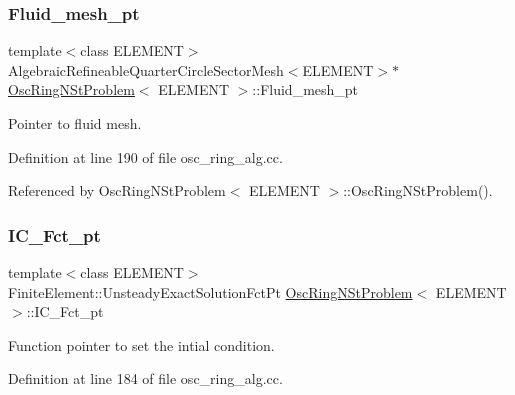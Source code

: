 \subsubsection{\texorpdfstring{Fluid\+\_\+mesh\+\_\+pt}{Fluid\_mesh\_pt}\hspace{0.1cm}{\footnotesize\ttfamily [2/2]}}
{\footnotesize\ttfamily template$<$class E\+L\+E\+M\+E\+NT$>$ \\
Algebraic\+Refineable\+Quarter\+Circle\+Sector\+Mesh$<$E\+L\+E\+M\+E\+NT$>$$\ast$ \hyperlink{classOscRingNStProblem}{Osc\+Ring\+N\+St\+Problem}$<$ E\+L\+E\+M\+E\+NT $>$\+::Fluid\+\_\+mesh\+\_\+pt\hspace{0.3cm}{\ttfamily [private]}}



Pointer to fluid mesh. 



Definition at line 190 of file osc\+\_\+ring\+\_\+alg.\+cc.



Referenced by Osc\+Ring\+N\+St\+Problem$<$ E\+L\+E\+M\+E\+N\+T $>$\+::\+Osc\+Ring\+N\+St\+Problem().

\mbox{\label{classOscRingNStProblem_ad9b2810092588c7708660c5325c73256}} 
\subsubsection{\texorpdfstring{I\+C\+\_\+\+Fct\+\_\+pt}{IC\_Fct\_pt}}
{\footnotesize\ttfamily template$<$class E\+L\+E\+M\+E\+NT$>$ \\
Finite\+Element\+::\+Unsteady\+Exact\+Solution\+Fct\+Pt \hyperlink{classOscRingNStProblem}{Osc\+Ring\+N\+St\+Problem}$<$ E\+L\+E\+M\+E\+NT $>$\+::I\+C\+\_\+\+Fct\+\_\+pt\hspace{0.3cm}{\ttfamily [private]}}



Function pointer to set the intial condition. 



Definition at line 184 of file osc\+\_\+ring\+\_\+alg.\+cc.

\mbox{\label{classOscRingNStProblem_a6688cac5da1f4092a9cd343ad5fdfd53}} 
